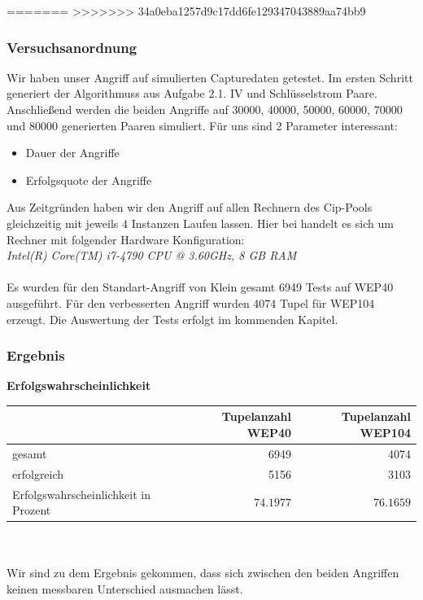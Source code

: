 \documentclass[10pt,a4paper]{article}
\begin{document}
=======
\label{ssec:vergleich}
>>>>>>> 34a0eba1257d9c17dd6fe129347043889aa74bb9

\subsubsection{Versuchsanordnung}
Wir haben unser Angriff auf simulierten Capturedaten getestet. Im ersten Schritt generiert der Algorithmuss aus Aufgabe 2.1. IV und Schlüsselstrom Paare. Anschließend werden die beiden Angriffe auf 30000, 40000, 50000, 60000, 70000 und 80000 generierten Paaren simuliert. Für uns sind 2 Parameter interessant: 
\begin{itemize}
	\item Dauer der Angriffe
	\item Erfolgsquote der Angriffe
\end{itemize}

Aus Zeitgründen haben wir den Angriff auf allen Rechnern des Cip-Pools gleichzeitig mit jeweils 4 Instanzen Laufen lassen.
Hier bei handelt es sich um Rechner mit folgender Hardware Konfiguration:
\\
\textit{Intel(R) Core(TM) i7-4790 CPU @ 3.60GHz, 8 GB RAM}
\\\\
Es wurden für den Standart-Angriff von Klein gesamt 6949 Tests auf WEP40 ausgeführt. Für den verbesserten Angriff wurden 4074 Tupel für WEP104 erzeugt. 
Die Auswertung der Tests erfolgt im kommenden Kapitel.
\subsubsection{Ergebnis}

\textbf{Erfolgswahrscheinlichkeit}



\begin{tabular}{|l|r|r|}
	\hline
	 & Tupelanzahl WEP40 & Tupelanzahl WEP104 \\
	\hline
	gesamt & 6949 & 4074 \\
	\hline
	erfolgreich & 5156 & 3103\\
	\hline
	Erfolgswahrscheinlichkeit in Prozent & $~74.1977$ & $~76.1659$\\
	\hline
\end{tabular}
\\\\
Wir sind zu dem Ergebnis gekommen, dass sich zwischen den beiden Angriffen keinen messbaren Unterschied ausmachen lässt.
\end{document}
